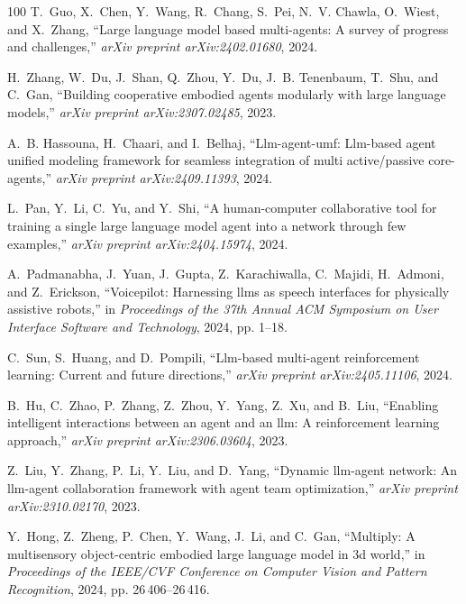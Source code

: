 \documentclass[10pt,journal,compsoc]{IEEEtran}
\begin{document}
\begin{thebibliography}{100}
	T.~Guo, X.~Chen, Y.~Wang, R.~Chang, S.~Pei, N.~V. Chawla, O.~Wiest, and
	X.~Zhang, ``Large language model based multi-agents: A survey of progress and
	challenges,'' \emph{arXiv preprint arXiv:2402.01680}, 2024.
	
	H.~Zhang, W.~Du, J.~Shan, Q.~Zhou, Y.~Du, J.~B. Tenenbaum, T.~Shu, and C.~Gan,
	``Building cooperative embodied agents modularly with large language
	models,'' \emph{arXiv preprint arXiv:2307.02485}, 2023.
	
	A.~B. Hassouna, H.~Chaari, and I.~Belhaj, ``Llm-agent-umf: Llm-based agent
	unified modeling framework for seamless integration of multi active/passive
	core-agents,'' \emph{arXiv preprint arXiv:2409.11393}, 2024.
	
	L.~Pan, Y.~Li, C.~Yu, and Y.~Shi, ``A human-computer collaborative tool for
	training a single large language model agent into a network through few
	examples,'' \emph{arXiv preprint arXiv:2404.15974}, 2024.
	
	A.~Padmanabha, J.~Yuan, J.~Gupta, Z.~Karachiwalla, C.~Majidi, H.~Admoni, and
	Z.~Erickson, ``Voicepilot: Harnessing llms as speech interfaces for
	physically assistive robots,'' in \emph{Proceedings of the 37th Annual ACM
		Symposium on User Interface Software and Technology}, 2024, pp. 1--18.
	
	C.~Sun, S.~Huang, and D.~Pompili, ``Llm-based multi-agent reinforcement
	learning: Current and future directions,'' \emph{arXiv preprint
		arXiv:2405.11106}, 2024.
	
	B.~Hu, C.~Zhao, P.~Zhang, Z.~Zhou, Y.~Yang, Z.~Xu, and B.~Liu, ``Enabling
	intelligent interactions between an agent and an llm: A reinforcement
	learning approach,'' \emph{arXiv preprint arXiv:2306.03604}, 2023.
	
	Z.~Liu, Y.~Zhang, P.~Li, Y.~Liu, and D.~Yang, ``Dynamic llm-agent network: An
	llm-agent collaboration framework with agent team optimization,'' \emph{arXiv
		preprint arXiv:2310.02170}, 2023.
	
	Y.~Hong, Z.~Zheng, P.~Chen, Y.~Wang, J.~Li, and C.~Gan, ``Multiply: A
	multisensory object-centric embodied large language model in 3d world,'' in
	\emph{Proceedings of the IEEE/CVF Conference on Computer Vision and Pattern
		Recognition}, 2024, pp. 26\,406--26\,416.
	

\end{thebibliography}
\end{document}
